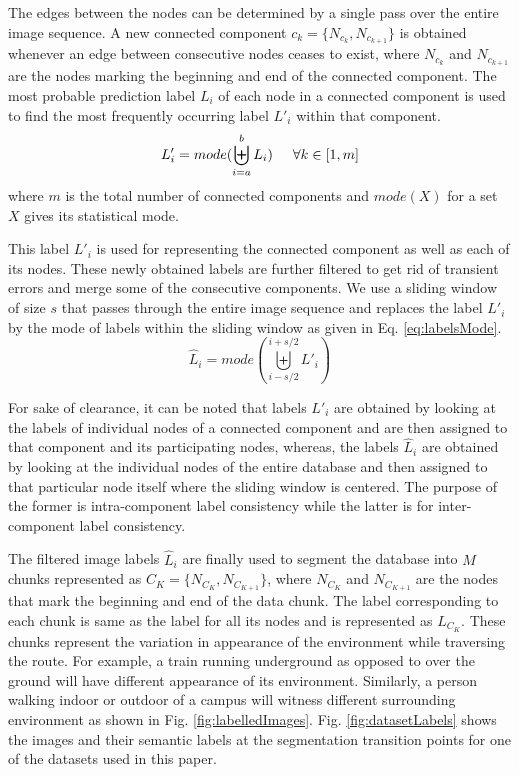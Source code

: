 \documentclass[letterpaper, 10 pt, conference]{ieeeconf}  %
\begin{document}
The edges between the nodes can be determined by a single pass over the entire image sequence. A new connected component $c_k = \{N_{c_k},N_{c_{k+1}}\}$ is obtained whenever an edge between consecutive nodes ceases to exist, where $N_{c_k}$ and $N_{c_{k+1}}$ are the nodes marking the beginning and end of the connected component. The most probable prediction label $L_i$ of each node in a connected component is used to find the most frequently occurring label $L'_i$ within that component. 
\begin{equation}
 L'_i = mode(\biguplus\limits_{i=a}^{b} L_i) \hspace{0.5cm} \forall k \in [1,m]
  \label{eq:labelsModeCC}
\end{equation}
where $m$ is the total number of connected components and $mode(X)$ for a set $X$ gives its statistical mode.

This label $L'_i$ is used for representing the connected component as well as each of its nodes. These newly obtained labels are further filtered to get rid of transient errors and merge some of the consecutive components. We use a sliding window of size $s$ that passes through the entire image sequence and replaces the label $L'_i$ by the mode of labels within the sliding window as given in Eq. \ref{eq:labelsMode}.
\begin{equation}
 \hat{L}_i = mode(\biguplus\limits_{i-s/2}^{i+s/2} L'_i)
 \label{eq:labelsMode}
\end{equation}

For sake of clearance, it can be noted that labels $L'_i$ are obtained by looking at the labels of individual nodes of a connected component and are then assigned to that component and its participating nodes, whereas, the labels $\hat{L}_i$ are obtained by looking at the individual nodes of the entire database and then assigned to that particular node itself where the sliding window is centered. The purpose of the former is intra-component label consistency while the latter is for inter-component label consistency.

The filtered image labels $\hat{L}_i$ are finally used to segment the database into $M$ chunks represented as $C_K = \{N_{C_K},N_{C_{K+1}}\}$, where $N_{C_K}$ and $N_{C_{K+1}}$ are the nodes that mark the beginning and end of the data chunk. The label corresponding to each chunk is same as the label for all its nodes and is represented as $\hat{L}_{C_K}$. These chunks represent the variation in appearance of the environment while traversing the route. For example, a train running underground as opposed to over the ground will have different appearance of its environment. Similarly, a person walking indoor or outdoor of a campus will witness different surrounding environment as shown in Fig. \ref{fig:labelledImages}. Fig. \ref{fig:datasetLabels} shows the images and their semantic labels at the segmentation transition points for one of the datasets used in this paper.
\end{document}
